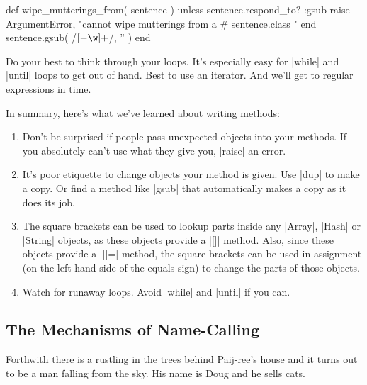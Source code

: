 \documentclass[12pt,twoside]{report}
\begin{document}
\begin{rubycode}

 def wipe_mutterings_from( sentence )
   unless sentence.respond_to? :gsub
     raise ArgumentError,
       "cannot wipe mutterings from a #{ sentence.class }"
   end
   sentence.gsub( /\([-\w]+\)/, '' )
 end

\end{rubycode}


Do your best to think through your loops.  It's especially easy for
\rubyinline|while| and
\rubyinline|until| loops to get out of hand.  Best to
use an iterator.  And we'll get to regular expressions in time.

In summary, here's what we've learned about writing methods:

\begin{enumerate}
\item Don't be surprised if people pass unexpected objects into your
  methods. If you absolutely can't use what they give you,
  \rubyinline|raise| an error.
\item It's poor etiquette to change objects your method is given.  Use
  \rubyinline|dup| to make a copy.  Or find a method
  like \rubyinline|gsub| that automatically makes a
  copy as it does its job.
\item The square brackets can be used to lookup parts inside any
  \rubyinline|Array|,
  \rubyinline|Hash| or
  \rubyinline|String| objects, as these objects
  provide a \rubyinline|[]| method.  Also, since these
  objects provide a \rubyinline|[]=| method, the
  square brackets can be used in assignment (on the left-hand side of
  the equals sign) to change the parts of those objects.
\item Watch for runaway loops.  Avoid
  \rubyinline|while| and
  \rubyinline|until| if you can.
\end{enumerate}

\newpage



\subsection{The Mechanisms of Name-Calling}




Forthwith there is a rustling in the trees behind Paij-ree's house and
it turns out to be a man falling from the sky.  His name is Doug and
he sells cats.
\end{document}
